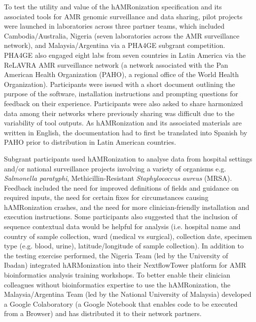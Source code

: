 To test the utility and value of the hAMRonization specification and its associated tools for AMR genomic surveillance and data sharing, pilot projects were launched in laboratories across three partner teams, which included Cambodia/Australia, Nigeria (seven laboratories across the AMR surveillance network), and Malaysia/Argentina via a PHA4GE subgrant competition. PHA4GE also engaged eight labs from seven countries in Latin America via the ReLAVRA AMR surveillance network (a network associated with the Pan American Health Organization (PAHO), a regional office of the World Health Organization). Participants were issued with a short document outlining the purpose of the software, installation instructions and prompting questions for feedback on their experience. Participants were also asked to share harmonized data among their networks where previously sharing was difficult due to the variability of tool outputs. As hAMRonization and its associated materials are written in English, the documentation had to first be translated into Spanish by PAHO prior to distribution in Latin American countries. 

Subgrant participants used hAMRonization to analyse data from hospital settings and/or national surveillance projects involving a variety of organisms e.g. \textit{Salmonella paratyphi}, Methicillin-Resistant \textit{Staphylococcus aureus} (MRSA). Feedback included the need for improved definitions of fields and guidance on required inputs, the need for certain fixes for circumstances causing hAMRonization crashes, and the need for more clinician-friendly installation and execution instructions. Some participants also suggested that the inclusion of sequence contextual data would be helpful for analysis (i.e. hospital name and country of sample collection, ward (medical vs surgical), collection date, specimen type (e.g. blood, urine), latitude/longitude of sample collection). In addition to the testing exercise performed, the Nigeria Team (led by the University of Ibadan) integrated hARMonization into their NextflowTower platform for AMR bioinformatics analysis training workshops. To better enable their clinician colleagues without bioinformatics expertise to use the hAMRonization, the Malaysia/Argentina Team (led by the National University of Malaysia) developed a Google Colaboratory (a Google Notebook that enables code to be executed from a Browser) and has distributed it to their network partners.

